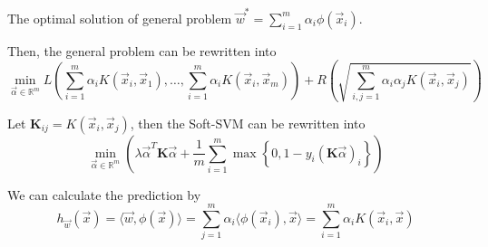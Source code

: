 \begin{theorem}
    The optimal solution of general problem $ \vec{w}^* = \sum^{m}_{i=1} \alpha_i \phi(\vec{x}_i) $.
\end{theorem}

Then, the general problem can be rewritten into
\[
    \min_{\vec{\alpha} \in \mathbb{R}^m} L \left( \sum^{m}_{i=1} \alpha_i K(\vec{x}_i, \vec{x}_1), \ldots, \sum^{m}_{i=1} \alpha_i K(\vec{x}_i, \vec{x}_m) \right) + R \left( \sqrt{ \sum^{m}_{i,j=1} \alpha_i \alpha_j K(\vec{x}_i, \vec{x}_j)} \right)
\]

Let $ \mathbf{K}_{ij} = K(\vec{x}_i, \vec{x}_j) $, then the Soft-SVM can be rewritten into
\[
    \min_{\vec{\alpha} \in \mathbb{R}^m} \left( \lambda \vec{\alpha}^T \mathbf{K} \vec{\alpha} + \frac{1}{m} \sum^{m}_{i=1} \max \left\{ 0, 1 - y_i {(\mathbf{K} \vec{\alpha})}_i \right\} \right)
\]

We can calculate the prediction by
\[
    h_{\vec{w}}(\vec{x}) = \langle \vec{w}, \phi(\vec{x}) \rangle
    = \sum^{m}_{j=1} \alpha_i \langle \phi(\vec{x}_i), \vec{x} \rangle = \sum^{m}_{i=1} \alpha_i K(\vec{x}_i, \vec{x})
\]
